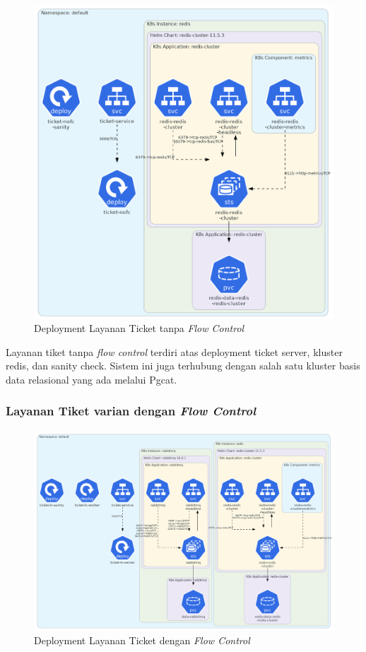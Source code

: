 \begin{figure}[htbp]
    \centering
    \includegraphics[width=1\textwidth]{resources/chapter-4/ticket-nofc.png}
    \caption{Deployment Layanan Ticket tanpa \textit{Flow Control}}
    \label{fig:deployment-ticket-nofc}
\end{figure}

Layanan tiket tanpa \textit{flow control} terdiri atas deployment ticket server, kluster redis, dan sanity check. Sistem ini juga terhubung dengan salah satu kluster basis data relasional yang ada melalui Pgcat.

\pagebreak

\subsubsection{Layanan Tiket varian dengan \textit{Flow Control}}

\begin{figure}[htbp]
    \centering
    \includegraphics[width=1\textwidth]{resources/chapter-4/ticket-fc.png}
    \caption{Deployment Layanan Ticket dengan \textit{Flow Control}}
    \label{fig:deployment-ticket-fc}
\end{figure}

